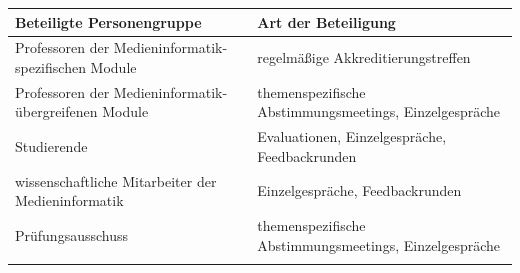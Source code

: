 \begin{longtable}[]{@{}ll@{}}
\toprule
\begin{minipage}[b]{0.5\columnwidth}\raggedright\strut
Beteiligte Personengruppe\strut
\end{minipage} & \begin{minipage}[b]{0.5\columnwidth}\raggedright\strut
Art der Beteiligung\strut
\end{minipage}\tabularnewline
\midrule
\endhead
\begin{minipage}[t]{0.5\columnwidth}\raggedright\strut
Professoren der Medieninformatik-spezifischen Module\strut
\end{minipage} & \begin{minipage}[t]{0.5\columnwidth}\raggedright\strut
regelmäßige Akkreditierungstreffen\strut
\end{minipage}\tabularnewline
\begin{minipage}[t]{0.5\columnwidth}\raggedright\strut
Professoren der Medieninformatik-übergreifenen Module\strut
\end{minipage} & \begin{minipage}[t]{0.5\columnwidth}\raggedright\strut
themenspezifische Abstimmungsmeetings, Einzelgespräche\strut
\end{minipage}\tabularnewline
\begin{minipage}[t]{0.5\columnwidth}\raggedright\strut
Studierende\strut
\end{minipage} & \begin{minipage}[t]{0.5\columnwidth}\raggedright\strut
Evaluationen, Einzelgespräche, Feedbackrunden\strut
\end{minipage}\tabularnewline
\begin{minipage}[t]{0.5\columnwidth}\raggedright\strut
wissenschaftliche Mitarbeiter der Medieninformatik\strut
\end{minipage} & \begin{minipage}[t]{0.5\columnwidth}\raggedright\strut
Einzelgespräche, Feedbackrunden\strut
\end{minipage}\tabularnewline
\begin{minipage}[t]{0.5\columnwidth}\raggedright\strut
Prüfungsausschuss\strut
\end{minipage} & \begin{minipage}[t]{0.5\columnwidth}\raggedright\strut
themenspezifische Abstimmungsmeetings, Einzelgespräche\strut
\end{minipage}\tabularnewline
\begin{minipage}[t]{0.5\columnwidth}\raggedright\strut

\end{minipage}
\end{longtable}
